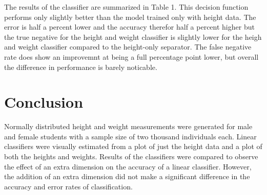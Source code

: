 \documentclass[10pt,letterpaper]{hitec}
\begin{document}
The results of the classifier are summarized in Table 1. This decision function performs only slightly better than the model trained only with height data. The error is half a percent lower and the accuracy therefor half a percent higher but the true negative for the height and weight classifier is slightly lower for the heigh and weight classifier compared to the height-only separator. The false negative rate does show an improvemnt at being a full percentage point lower, but overall the difference in performance is barely noticable. 

\section*{Conclusion}
Normally distributed height and weight measurements were generated for male and female students with a sample size of two thousand individuals each. Linear classifiers were visually estimated from a plot of just the height data and a plot of both the heights and weights. Results of the classifiers were compared to observe the effect of an extra dimension on the accuracy of a linear classifier. However, the addition of an extra dimension did not make a significant difference in the accuracy and error rates of classification.  

\end{document}
